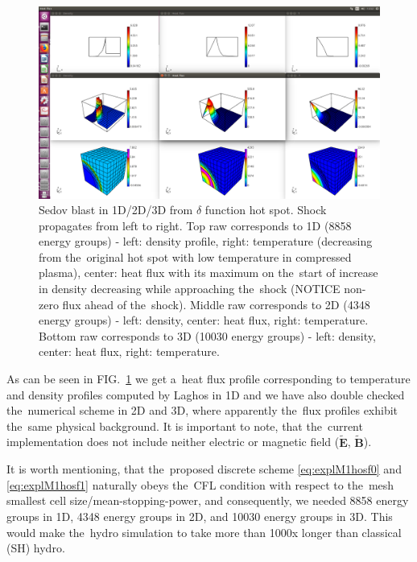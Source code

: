 \documentclass[review]{elsarticle}
\newcommand{\vect}[1]{\boldsymbol{#1}}
\newcommand{\tE}{\vect{\tilde{E}}}
\newcommand{\tB}{\vect{\tilde{B}}}
\newcommand{\figref}[1]{FIG.~\ref{#1}}
\begin{document}
\begin{figure}[tbh]
  \begin{center}
      \includegraphics[width=1.0\textwidth]{M1Sedov1D2D3D.png}
  \caption{
  Sedov blast in 1D/2D/3D from $\delta$ function hot spot. 
  Shock propagates from left to right. Top raw corresponds to 1D 
  (8858 energy groups) - 
  left: density profile, right: temperature 
  (decreasing from the~original hot spot with low temperature in compressed 
  plasma), center: heat flux with its maximum on the~start of increase 
  in density decreasing while approaching the~shock 
  (NOTICE non-zero flux ahead of the~shock). 
  Middle raw corresponds to 2D (4348 energy groups) - 
  left: density, center: heat flux, right: temperature.
  Bottom raw corresponds to 3D (10030 energy groups) - 
  left: density, center: heat flux, right: temperature. 
  }
  \end{center}
  \label{fig:expl1D2D3D}
\end{figure}

As can be seen in \figref{fig:expl1D2D3D} we get a~heat flux profile 
corresponding to temperature and density profiles computed by Laghos 
\cite{Dobrev_Kolev_Rieben-High-order_curvilinear_finite_element_methods_for_Lagrangian_hydrodynamics}
in 1D and we have also double checked the~numerical scheme in 2D and 3D, where
apparently the~flux profiles exhibit the~same physical background.
It is important to note, that the~current implementation does not include
neither electric or magnetic field ($\tE$, $\tB$).

It is worth mentioning, that the~proposed discrete scheme 
\eqref{eq:explM1hosf0} and \eqref{eq:explM1hosf1} naturally obeys the~CFL
condition with respect to the~mesh smallest cell size/mean-stopping-power, and
consequently, we needed 8858 energy groups in 1D, 4348 energy groups in 2D, and
10030 energy groups in 3D. This would make the~hydro simulation to take 
more than 1000x longer than classical (SH) hydro.
\end{document}
